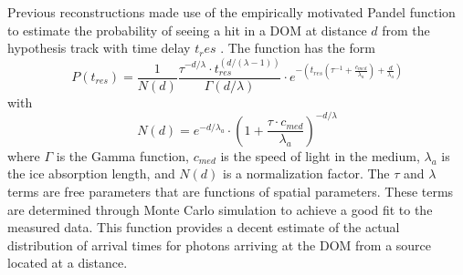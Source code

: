 \documentclass{gatech-thesis}
\begin{document}
Previous reconstructions made use of the empirically motivated Pandel function to estimate the probability of seeing a hit in a DOM at distance $d$ from the hypothesis track with time delay $t_res$ \cite{2004NIMPA.524..169A}. The function has the form
\begin{equation}
\label{eq:Pandel}
P(t_{res}) = \frac{1}{N(d)}\frac{\tau^{-d/\lambda}\cdot t_{res}^{(d/(\lambda-1))}}{\Gamma(d/\lambda)} \cdot e^{-(t_{res}(\tau ^{-1}+\frac{c_{med}}{\lambda _a})+\frac{d}{\lambda _a})}
\end{equation}
with
\begin{equation}
N(d) = e^{-d/\lambda _a} \cdot \left(1+\frac{\tau \cdot c_{med}}{\lambda _a}\right)^{-d/\lambda}
\end{equation}
where $\Gamma$ is the Gamma function, $c_{med}$ is the speed of light in the medium, $\lambda _a$ is the ice absorption length, and $N(d)$ is a normalization factor. The $\tau$ and $\lambda$ terms are free parameters that are functions of spatial parameters. These terms are determined through Monte Carlo simulation to achieve a good fit to the measured data. This function provides a decent estimate of the actual distribution of arrival times for photons arriving at the DOM from a source located at a distance. 
\end{document}
